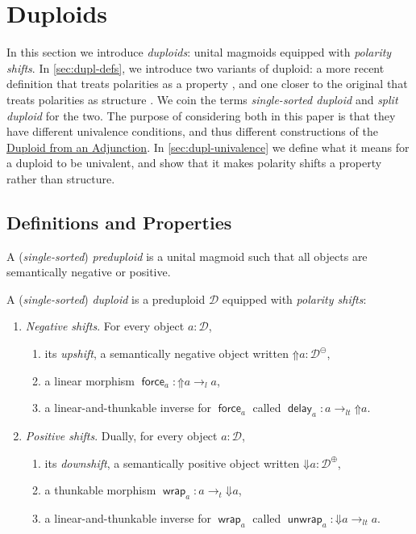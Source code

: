 \documentclass[runningheads]{llncs}
\newcommand*\rocqlogo{\usebox{\rocqlogobox}}
\newcommand{\lemmaref}[3]{\href{https://github.com/UniMath/UniMath/blob/94fae0eda57a778cec704bfa73b4ff525c9bc475/#1\#L#2?name=#3}{\rocqlogo}}
\newcommand{\acat}[1]{\mathcal{#1}}
\newcommand{\D}{\acat{D}}
\newcommand{\Cl}[1]{#1_l}
\newcommand{\Ct}[1]{#1_t}
\newcommand{\Clt}[1]{#1_{lt}}
\newcommand{\Cn}[1]{#1^\ominus}
\newcommand{\Cp}[1]{#1^\oplus}
\newcommand{\force}{\mathop{\mathsf{force}}\nolimits}
\newcommand{\delay}{\mathop{\mathsf{delay}}\nolimits}
\newcommand{\wrap}{\mathop{\mathsf{wrap}}\nolimits}
\newcommand{\unwrap}{\mathop{\mathsf{unwrap}}\nolimits}
\newcommand{\upshift}{\mathord{\Uparrow}}
\newcommand{\downshift}{\mathord{\Downarrow}}
\begin{document}
\section{Duploids}
\label{sec:duploids}
In this section we introduce \emph{duploids}: unital magmoids equipped with
\emph{polarity shifts}. In \autoref{sec:dupl-defs}, we introduce two
variants of duploid: a more recent definition that treats polarities
as a property \cite{Clairambault17,Mangel25}, and one closer to the
original that treats polarities as structure
\cite{MunchMaccagnoni13,MunchMaccagnoni14}. We coin the terms
\emph{single\hyp{}sorted duploid} and \emph{split duploid} for the two. The purpose
of considering both in this paper is that they have different
univalence conditions, and thus different constructions of the \hyperref[sec:from-adjunctions]{Duploid
from an Adjunction}. In \autoref{sec:dupl-univalence} we define what it
means for a duploid to be univalent, and show that it makes polarity
shifts a property rather than structure.
\subsection{Definitions and Properties}
\label{sec:dupl-defs}
\begin{definition}[{\lemmaref{UniMath/CategoryTheory/Nonassociative/Duploids/Core.v}{92}{preduploid}, \lemmaref{UniMath/CategoryTheory/Nonassociative/Duploids/Core.v}{354}{duploid} \cite{MunchMaccagnoni14,Clairambault17,Mangel25}}]
\label{def:duploid}
A (\emph{single\hyp{}sorted}) \emph{preduploid} is a unital magmoid such
that all objects are semantically negative or positive.

A (\emph{single\hyp{}sorted}) \emph{duploid} is a preduploid \(\D\) equipped with \emph{polarity shifts}:
\begin{enumerate}
\item \emph{Negative shifts}. For every object \(a : \D\),
\begin{enumerate}
\item its \emph{upshift}, a semantically negative object written \(\upshift{a} : \Cn\D\),
\item a linear morphism \(\force_a \colon \upshift{}a \Cl\to a\),
\item a linear\hyp{}and\hyp{}thunkable inverse for \(\force_a\) called
\(\delay_a \colon a \Clt\to \upshift{}a\).
\end{enumerate}
\item \emph{Positive shifts}.  Dually, for every object
\(a : \D\),
\begin{enumerate}
\item its \emph{downshift}, a semantically positive object written \(\downshift{}a : \Cp\D\),
\item a thunkable morphism \(\wrap_a \colon a \Ct\to \downshift{a}\),
\item a linear\hyp{}and\hyp{}thunkable inverse for \(\wrap_a\) called
\(\unwrap_a \colon \downshift{}a \Clt\to a\).
\end{enumerate}
\end{enumerate}
\end{definition}
\end{document}
